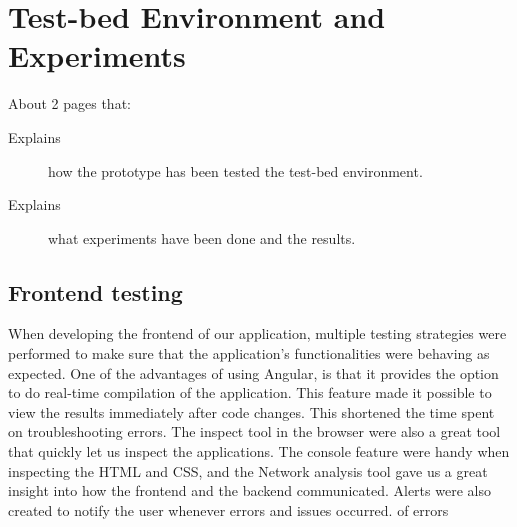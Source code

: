 \section{Test-bed Environment and Experiments}
\label{sec:evaluation}

About 2 pages that:

\begin{description}
\item[Explains] how the prototype has been tested the test-bed environment.

\item[Explains] what experiments have been done and the results.

\end{description}

\subsection{Frontend testing}
When developing the frontend of our application, multiple testing strategies were performed to make sure that the 
application's functionalities were behaving as expected. One of the advantages of using Angular, is that it provides 
the option to do real-time compilation of the application. This feature made it possible to view the results immediately 
after code changes. This shortened the time spent on troubleshooting errors. The inspect tool in the browser were 
also a great tool that quickly let us inspect the applications. The console feature were handy when inspecting the 
HTML and CSS, and the Network analysis tool gave us a great insight into how the frontend and the backend 
communicated. Alerts were also created to notify the user whenever errors and issues occurred. 
of errors 

